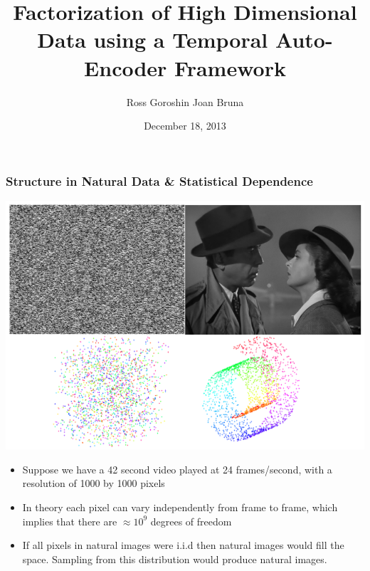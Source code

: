 \documentclass{beamer}
\title{Factorization of High Dimensional Data using a Temporal Auto-Encoder Framework}
\date{December 18, 2013}
\author{Ross Goroshin \hspace{0.20cm} Joan Bruna}
\begin{document}
\begin{frame}
\titlepage
\end{frame}

\begin{frame}
\frametitle{Structure in Natural Data \& Statistical Dependence}  
\begin{center}
\includegraphics[scale=0.2]{./figures/structure.png}
\begin{itemize} 
\item Suppose we have a 42 second video played at 24 frames/second, with a resolution of 1000 by 1000 pixels
\item In theory each pixel can vary independently from frame to frame, which implies that there are $\approx 10^9$ degrees of freedom 
\item If all pixels in natural images were i.i.d then natural images would fill the space. Sampling from this distribution would produce natural images.
\end{itemize} 
\end{center}
\end{frame}
\end{document}
